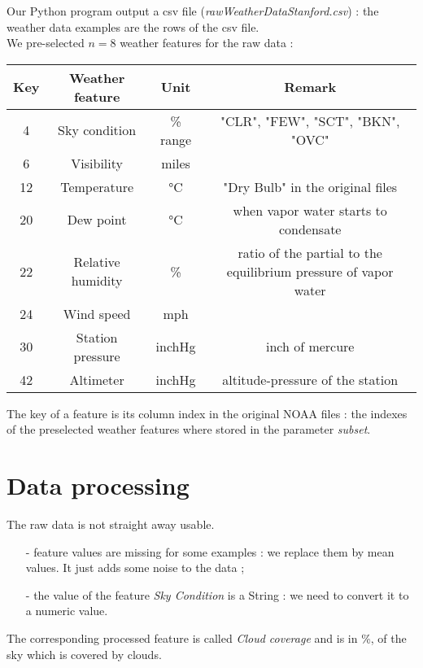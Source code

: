 \documentclass[]{report}
\begin{document}
	Our Python program output a csv file (\emph{rawWeatherDataStanford.csv}) : the weather data examples are the rows of the csv file.\\	

	We pre-selected \emph{$n=8$} weather features for the raw data :\\
	
	\begin{center}
	\begin{tabular}{|c|c|c|c|}
		\hline
		Key & Weather feature & Unit & Remark\\ \hline
		4 & Sky condition & \% range & "CLR", "FEW", "SCT", "BKN", "OVC"\\ \hline
		6 & Visibility & miles & \\ \hline
		12 & Temperature & °C & "Dry Bulb" in the original files\\ \hline
		20 & Dew point & °C & when vapor water starts to condensate\\ \hline
		22 & Relative humidity & \%  & ratio of the partial to the equilibrium pressure of vapor water\\ \hline
		24 & Wind speed & mph & \\ \hline
		30 & Station pressure & inchHg & inch of mercure\\ \hline
		42 & Altimeter & inchHg & altitude-pressure of the station\\ \hline		
	\end{tabular}	
	\newline
	\end{center}
	
	The key of a feature is its column index in the original NOAA files : the indexes of the preselected weather features where stored in the parameter \emph{subset}.
	
	\section{Data processing}
	The raw data is not straight away usable.
	
	\begin{itemize}
		\item [-] feature values are missing for some examples : we replace them by mean values. It just adds some noise to the data ;
		\item [-] the value of the feature \emph{Sky Condition} is a String : we need to convert it to a numeric value.
	\end{itemize}

	The corresponding processed feature is called \emph{Cloud coverage} and is in \%, of the sky which is covered by clouds.\\
	
\end{document}
